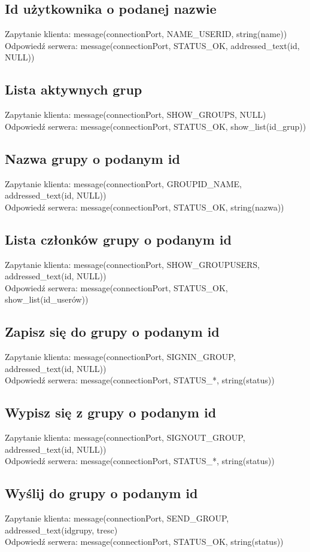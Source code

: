 \documentclass[a4paper]{article}
\begin{document}
\subsection{Id użytkownika o podanej nazwie}
Zapytanie klienta: message(connectionPort, NAME\_USERID, string(name))\\
Odpowiedź serwera: message(connectionPort, STATUS\_OK, addressed\_text(id, NULL))
\subsection{Lista aktywnych grup}
Zapytanie klienta: message(connectionPort, SHOW\_GROUPS, NULL) \\
Odpowiedź serwera: message(connectionPort, STATUS\_OK, show\_list(id\_grup))
\subsection{Nazwa grupy o podanym id}
Zapytanie klienta: message(connectionPort, GROUPID\_NAME, addressed\_text(id, NULL))\\
Odpowiedź serwera: message(connectionPort, STATUS\_OK, string(nazwa))
\subsection{Lista członków grupy o podanym id}
Zapytanie klienta: message(connectionPort, SHOW\_GROUPUSERS, addressed\_text(id, NULL))\\
Odpowiedź serwera: message(connectionPort, STATUS\_OK, show\_list(id\_userów))
\subsection{Zapisz się do grupy o podanym id}
Zapytanie klienta: message(connectionPort, SIGNIN\_GROUP, addressed\_text(id, NULL))\\
Odpowiedź serwera: message(connectionPort, STATUS\_*, string(status))
\subsection{Wypisz się z grupy o podanym id}
Zapytanie klienta: message(connectionPort, SIGNOUT\_GROUP, addressed\_text(id, NULL))\\
Odpowiedź serwera: message(connectionPort, STATUS\_*, string(status))
\subsection{Wyślij do grupy o podanym id}
Zapytanie klienta: message(connectionPort, SEND\_GROUP, addressed\_text(idgrupy, tresc)\\
Odpowiedź serwera: message(connectionPort, STATUS\_OK, string(status))
\end{document}
